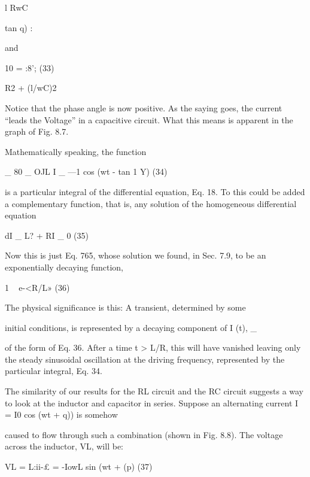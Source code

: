 \begin{equation}
\end{equation}
l
RwC

tan q) : 

and

10 = :8'; (33)

\/R2 + (l/wC)2

Notice that the phase angle is now positive. As the saying goes, the
current ``leads the Voltage'' in a capacitive circuit. What this means
is apparent in the graph of Fig. 8.7.

Mathematically speaking, the function

\begin{equation}
\end{equation}
_ 80 _ OJL
I _ \/---1  cos (wt - tan 1 Y) (34)

is a particular integral of the differential equation, Eq. 18. To this
could be added a complementary function, that is, any solution of
the homogeneous differential equation

\begin{equation}
\end{equation}
dI _
L? + RI _ 0 (35)

Now this is just Eq. 765, whose solution we found, in Sec. 7.9, to be
an exponentially decaying function,

\begin{equation}
\end{equation}
1 ~ e-<R/L» (36)

The physical significance is this: A transient, determined by some

 

  

initial conditions, is represented by a decaying component of I (t), _

of the form of Eq. 36. After a time t > L/R, this will have vanished
leaving only the steady sinusoidal oscillation at the driving frequency,
represented by the particular integral, Eq. 34.

The similarity of our results for the RL circuit and the RC circuit
suggests a way to look at the inductor and capacitor in series.
Suppose an alternating current I = I0 cos (wt + q)) is somehow

 
 

caused to flow through such a combination (shown in Fig. 8.8). The
voltage across the inductor, VL, will be:

\begin{equation}
\end{equation}
VL = L:ii-£ = -IowL sin (wt + (p) (37)

